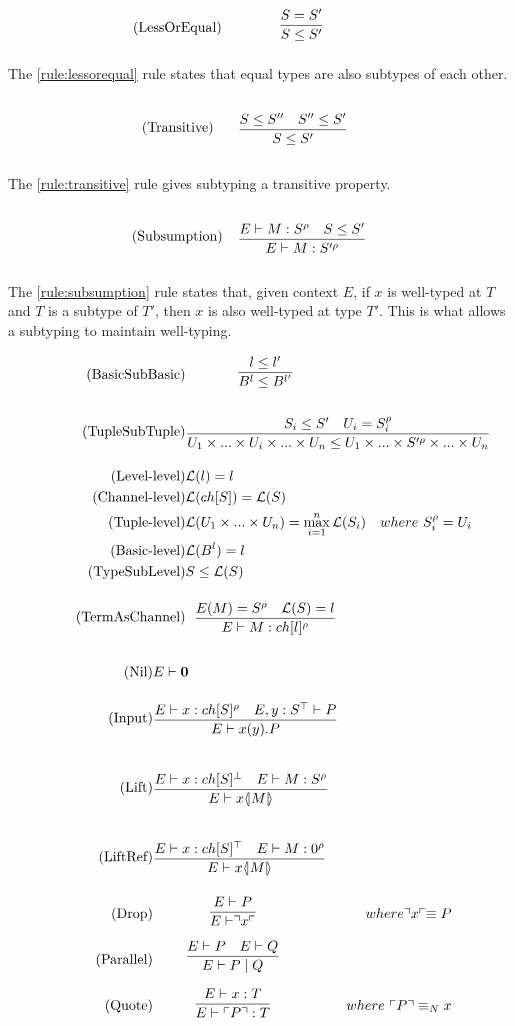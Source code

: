 \begin{align*}
\tag{LessOrEqual}\label{rule:lessorequal} &\infrule{S=S'}{S\leq S'}
\end{align*}

The \ref{rule:lessorequal} rule states that equal types are also subtypes of each other.

\begin{align*}
\tag{Transitive}\label{rule:transitive} &\infrule{S\leq S''\quad S''\leq S'}{S\leq S'}
\end{align*}

The \ref{rule:transitive} rule gives subtyping a transitive property.

\begin{align*}
\tag{Subsumption}\label{rule:subsumption} &\infrule{E\vdash M:S^\rho\quad S\leq S'}{E\vdash M:S'^\rho}
\end{align*}

The \ref{rule:subsumption} rule states that, given context $E$, if $x$ is well-typed at $T$ and $T$ is a subtype of $T'$, then $x$ is also well-typed at type $T'$. This is what allows a subtyping to maintain well-typing.

\begin{align*}
\tag{BasicSubBasic} &\infrule{l\leq l'}{B^l\leq B^{l'}}\\
\tag{TupleSubTuple} &\infrule{S_i\leq S'\quad U_i=S_i^\rho}{U_1\times...\times U_i\times...\times U_n\leq U_1\times...\times S'^\rho\times...\times U_n}\\
\tag{Level-level} &\level{l}=l\\
\tag{Channel-level} &\level{ch[S]} = \level{S}\\
\tag{Tuple-level} &\level{U_1\times...\times U_n}=\max_{i=1}^{n}{\level{S_i}}& where\ S_i^\rho=U_i\\
\tag{Basic-level} &\level{B^l}=l\\
\tag{TypeSubLevel} &S\leq \level{S}\\
\tag{TermAsChannel} &\infrule{E(M)=S^\rho\quad \level{S}=l}{E\vdash M:ch[l]^\rho}
\end{align*}

\begin{align*}
\tag{Nil} &E \vdash \nil\\
\tag{Input} &\infrule{E\vdash x:ch[S]^\rho\quad E,y:S^\top\vdash P}{E \vdash \inp{x}{y}P}\\
\tag{Lift} &\infrule{E\vdash x:ch[S]^\bot\quad E \vdash M:S^\rho}{E\vdash \lift{x}{M}}\\
\tag{LiftRef} &\infrule{E\vdash x:ch[S]^\top\quad E \vdash M:0^\rho}{E\vdash \lift{x}{M}}\\
\tag{Drop} &\infrule{E \vdash P}{E\vdash \drop{x}}& where \drop{x} \equiv P\\
\tag{Parallel} &\infrule{E\vdash P \quad E \vdash Q}{E \vdash P \para Q}\\
\tag{Quote} &\infrule{E \vdash x:T}{E\vdash \quot{P}:T}& where\ \quot{P} \equiv_N x
\end{align*}


